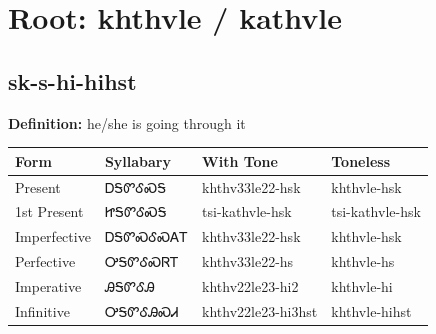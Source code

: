 \documentclass{article}%
\begin{document}
%
\normalsize%
\section*{Root: khthvle / kathvle}%
\subsection*{sk-s-hi-hihst}%
\textbf{Definition: }%
he/she is going through it%
\\[0.5em]%
\begin{tabular}{|l|l|l|l|}%
\hline%
\textbf{Form}&\textbf{Syllabary}&\textbf{With Tone}&\textbf{Toneless}\\%
\hline%
Present&ᎠᎦᏛᎴᏍᎦ&khthv33le22{-}hsk&khthvle{-}hsk\\%
1st Present&ᏥᎦᏛᎴᏍᎦ&tsi{-}kathvle{-}hsk&tsi{-}kathvle{-}hsk\\%
Imperfective&ᎠᎦᏛᏍᎴᏍᎪᎢ&khthv33le22{-}hsk&khthvle{-}hsk\\%
Perfective&ᎤᎦᏛᎴᏍᏒᎢ&khthv33le22{-}hs&khthvle{-}hs\\%
Imperative&ᎯᎦᏛᎴᎯ&khthv22le23{-}hi2&khthvle{-}hi\\%
Infinitive&ᎤᎦᏛᎴᎯᏍᏗ&khthv22le23{-}hi3hst&khthvle{-}hihst\\%
\hline%
\end{tabular}%
\\[1em]%
\end{document}
